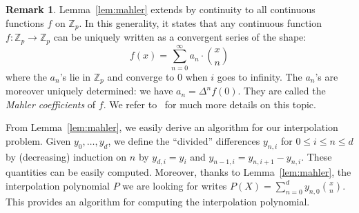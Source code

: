\documentclass[11pt]{article}
\numberwithin{equation}{section}
\numberwithin{figure}{section}
\renewcommand{\leq}{\leqslant}
\theoremstyle{definition}
\newtheorem{rem}[theo]{Remark}
\newcommand{\Z}{\mathbb Z}
\newcommand{\Zp}{\Z_p}
\begin{document}
\begin{rem}
Lemma~\ref{lem:mahler} extends by continuity to all continuous
functions $f$ on $\Zp$. In this generality, it states that any
continuous function $f : \Zp \to \Zp$ can be uniquely written as
a convergent series of the shape:
$$f(x) = \sum_{n=0}^\infty a_n \cdot \binom x n$$
where the $a_n$'s lie in $\Zp$ and converge to $0$ when $i$ goes
to infinity. The $a_n$'s are moreover uniquely determined: we have
$a_n = \Delta^n f(0)$. They are called the \emph{Mahler coefficients}
of $f$. We refer to~\cite{Ma58} for much more details on this topic.
\end{rem}

From Lemma~\ref{lem:mahler}, we easily derive an algorithm for our 
interpolation problem. Given $y_0, \ldots, y_d$, we define the 
``divided'' differences $y_{n,i}$ for $0 \leq i \leq n \leq d$ by 
(decreasing) induction on $n$ by $y_{d,i} = y_i$ and $y_{n-1,i} = 
y_{n,i+1} - y_{n,i}$. These quantities can be easily computed.
Moreover, thanks to Lemma~\ref{lem:mahler}, the interpolation 
polynomial $P$ we are looking for writes
$P(X) = \sum_{n=0}^d y_{n,0} \binom x n$.
This provides an algorithm for computing the interpolation polynomial.
\end{document}
